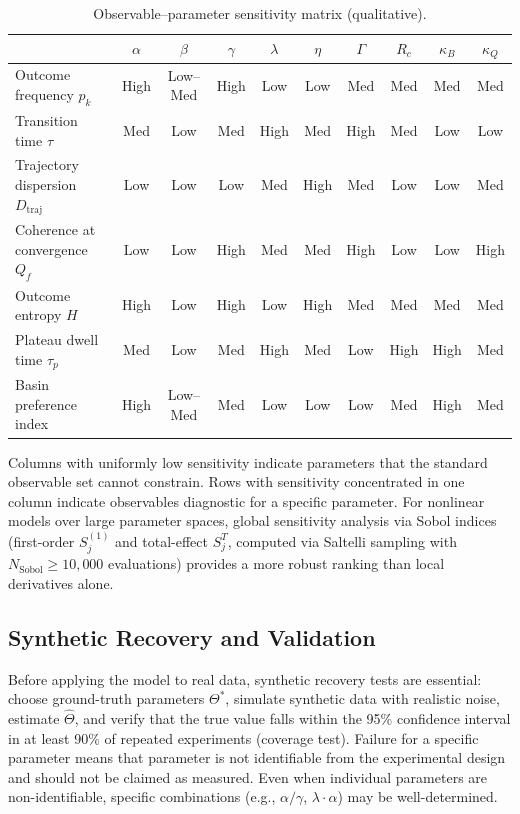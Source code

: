 \documentclass[12pt]{article}
\begin{document}
\begin{table}[ht]
\centering
\small
\caption{Observable--parameter sensitivity matrix (qualitative).}
\label{tab:sensitivity}
\begin{tabular}{@{}lccccccccc@{}}
\toprule
 & $\alpha$ & $\beta$ & $\gamma$ & $\lambda$ & $\eta$ & $\Gamma$ & $R_c$ & $\kappa_B$ & $\kappa_Q$ \\
\midrule
Outcome frequency $p_k$ & High & Low--Med & High & Low & Low & Med & Med & Med & Med \\
Transition time $\tau$ & Med & Low & Med & High & Med & High & Med & Low & Low \\
Trajectory dispersion $D_{\mathrm{traj}}$ & Low & Low & Low & Med & High & Med & Low & Low & Med \\
Coherence at convergence $Q_f$ & Low & Low & High & Med & Med & High & Low & Low & High \\
Outcome entropy $H$ & High & Low & High & Low & High & Med & Med & Med & Med \\
Plateau dwell time $\tau_p$ & Med & Low & Med & High & Med & Low & High & High & Med \\
Basin preference index & High & Low--Med & Med & Low & Low & Low & Med & High & Med \\
\bottomrule
\end{tabular}
\end{table}

Columns with uniformly low sensitivity indicate parameters that the standard observable set cannot constrain. Rows with sensitivity concentrated in one column indicate observables diagnostic for a specific parameter. For nonlinear models over large parameter spaces, global sensitivity analysis via Sobol indices (first-order $S_j^{(1)}$ and total-effect $S_j^{T}$, computed via Saltelli sampling with $N_{\mathrm{Sobol}} \geq 10{,}000$ evaluations) provides a more robust ranking than local derivatives alone.

\subsection{Synthetic Recovery and Validation}

Before applying the model to real data, synthetic recovery tests are essential: choose ground-truth parameters $\Theta^*$, simulate synthetic data with realistic noise, estimate $\hat{\Theta}$, and verify that the true value falls within the 95\% confidence interval in at least 90\% of repeated experiments (coverage test). Failure for a specific parameter means that parameter is not identifiable from the experimental design and should not be claimed as measured. Even when individual parameters are non-identifiable, specific combinations (e.g., $\alpha/\gamma$, $\lambda \cdot \alpha$) may be well-determined.
\end{document}
